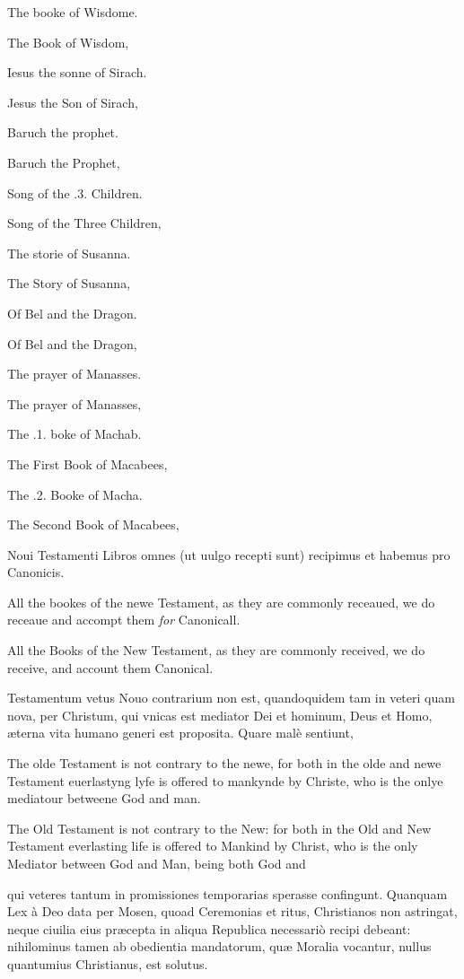 The booke of Wisdome.

The Book of Wisdom,

Iesus the sonne of Sirach.

Jesus the Son of Sirach,

Baruch the prophet.

Baruch the Prophet,

Song of the .3. Children.

Song of the Three Children,

The storie of Susanna.

The Story of Susanna,

Of Bel and the Dragon.

Of Bel and the Dragon,

The prayer of Manasses.

The prayer of Manasses,

The .1. boke of Machab.

The First Book of Macabees,

The .2. Booke of Macha.

The Second Book of Macabees,

Noui Testamenti Libros omnes (ut uulgo recepti sunt) recipimus et habemus pro Canonicis.

All the bookes of the newe Testament, as they are commonly receaued, we do receaue and accompt them \emph{for} Canonicall.

All the Books of the New Testament, as they are commonly received, we do receive, and account them Canonical.


Testamentum vetus Nouo contrarium non est, quandoquidem tam in veteri quam nova, per Christum, qui vnicas est mediator Dei et hominum, Deus et Homo, æterna vita humano generi est proposita. Quare malè sentiunt,

The olde Testament is not contrary to the newe, for both in the olde and newe Testament euerlastyng lyfe is offered to mankynde by Christe, who is the onlye mediatour betweene God and man.

The Old Testament is not contrary to the New: for both in the Old and New Testament everlasting life is offered to Mankind by Christ, who is the only Mediator between God and Man, being both God and

qui veteres tantum in promissiones temporarias sperasse confingunt. Quanquam Lex à Deo data per Mosen, quoad Ceremonias et ritus, Christianos non astringat, neque ciuilia eius præcepta in aliqua Republica necessariò recipi debeant: nihilominus tamen ab obedientia mandatorum, quæ Moralia vocantur, nullus quantumius Christianus, est solutus.

